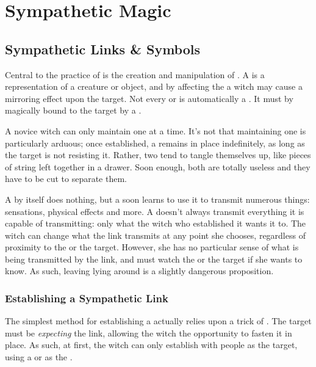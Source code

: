 \chapter{Sympathetic Magic}

\section{Sympathetic Links \& Symbols}

Central to the practice of  is the creation and manipulation of {\symbols}.
A {\symbol} is a representation of a creature or object, and by affecting the {\symbol} a witch may cause a mirroring effect upon the target.
Not every  or  is automatically a {\symbol}.
It must by magically bound to the target by a {\symlink}.

A novice witch can only maintain one {\symlink} at a time.
It's not that maintaining one is particularly arduous; once established, a {\symlink} remains in place indefinitely, as long as the target is not resisting it.
Rather, two {\symlinks} tend to tangle themselves up, like pieces of string left together in a drawer.
Soon enough, both are totally useless and they have to be cut to separate them.

A {\symlink} by itself does nothing, but a  soon learns to use it to transmit numerous things: sensations, physical effects and more.
A {\symlink} doesn't always transmit everything it is capable of transmitting: only what the witch who established it wants it to.
The witch can change what the link transmits at any point she chooses, regardless of proximity to the {\symbol} or the target.
However, she has no particular sense of what is being transmitted by the link, and must watch the {\symbol} or the target if she wants to know.
As such, leaving {\symbols} lying around is a slightly dangerous proposition.

\subsection{Establishing a Sympathetic Link}

The simplest method for establishing a {\symlink} actually relies upon a trick of .
The target must be \emph{expecting} the link, allowing the witch the opportunity to fasten it in place.
As such, at first, the witch can only establish {\symlinks} with people as the target, using a  or  as the {\symbol}.

